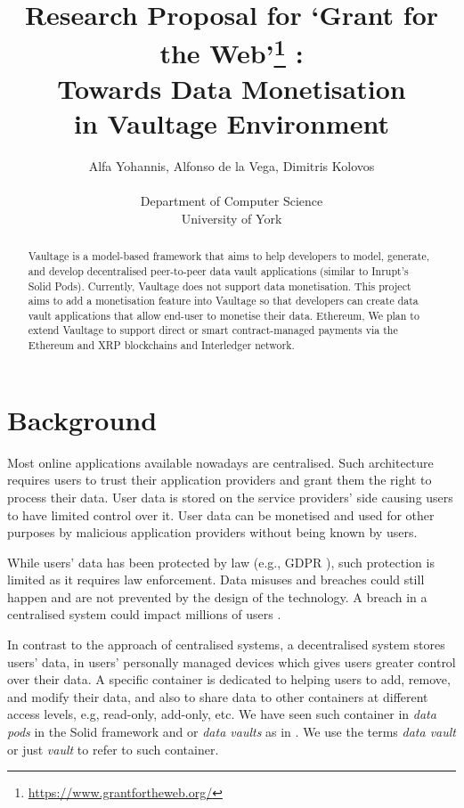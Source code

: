\documentclass[]{article}
\title{Research Proposal for `Grant for the Web'\footnote{\url{https://www.grantfortheweb.org/}} :\\Towards Data Monetisation\\in Vaultage Environment}
\author{
	Alfa Yohannis, Alfonso de la Vega, Dimitris Kolovos\\
	\\
	Department of Computer Science\\
	University of York
}
\date{}
\begin{document}
	\maketitle
	
	\begin{abstract}
	Vaultage is a model-based framework that aims to help developers to model, generate, and develop decentralised peer-to-peer data vault applications (similar to Inrupt's Solid Pods). Currently, Vaultage does not support data monetisation. This project aims to add a monetisation feature into Vaultage so that developers can create data vault applications that allow end-user to monetise their data. Ethereum, We plan to extend Vaultage to support direct or smart contract-managed payments via the Ethereum and XRP blockchains and Interledger network.
	\end{abstract}
	
	\section{Background}
	\label{sec:background}
	
	Most online applications available nowadays are centralised. Such architecture requires users to trust their application providers and grant them the right to process their data. User data is stored on the service providers' side causing users to have limited control over it. User data can be monetised and used for other purposes by malicious application providers without being known by users.
	
	While users' data has been protected by law (e.g., GDPR \cite{GDPR}), such protection is limited as it requires law enforcement. Data misuses and breaches could still happen and are not prevented by the design of the technology. A breach in a centralised system could impact millions of users 
	\cite{cambridgeanalytica,adobebreach,linkedinbreach,yahoobreach}.
	
	In contrast to the approach of centralised systems, a decentralised system stores users' data, in users' personally managed devices which gives users greater control over their data. A specific container is dedicated to helping users to add, remove, and modify their data, and also to share data to other containers at different access levels, e.g, read-only, add-only, etc. We have seen such container in \textit{data pods} in the Solid framework \cite{solid} and or \textit{data vaults} as in \cite{mun2010datavault}. We use the terms \textit{data vault} or just \textit{vault} to refer to such container.  
	
\end{document}
